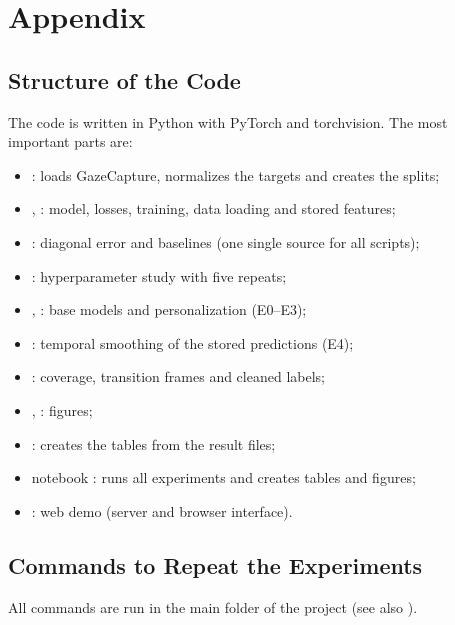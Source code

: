 \appendix
\chapter{Appendix}
\label{ch:anhang}

\section{Structure of the Code}
\label{sec:anhang_code}
The code is written in Python with PyTorch and torchvision. The most important
parts are:
\begin{itemize}[nosep]
  \item {}: loads GazeCapture, normalizes the targets and creates
        the splits;
  \item {}, : model, losses, training, data
        loading and stored features;
  \item {}: diagonal error and baselines (one single source for
        all scripts);
  \item {}: hyperparameter study with five repeats;
  \item {}, : base models and
        personalization (E0--E3);
  \item {}: temporal smoothing of the stored
        predictions (E4);
  \item {}: coverage, transition frames and cleaned
        labels;
  \item {}, : figures;
  \item {}: creates the tables from the result files;
  \item notebook : runs all experiments and
        creates tables and figures;
  \item {}: web demo (server and browser interface).
\end{itemize}

\section{Commands to Repeat the Experiments}
\label{sec:anhang_befehle}
All commands are run in the main folder of the project (see also
).

